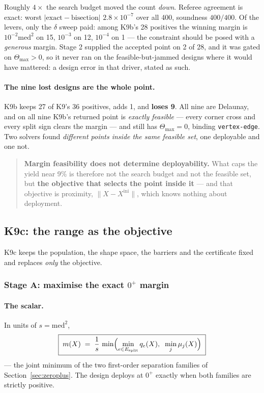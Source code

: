 \documentclass[11pt,a4paper]{article}
\theoremstyle{definition}
\newcommand{\Tmax}{\Theta_{\max}}
\newcommand{\Esplit}{E_{\mathrm{split}}}
\begin{document}
\noindent Roughly $4\times$ the search budget moved the count \emph{down}. Referee agreement
is exact: worst $|\text{exact}-\text{bisection}|$ $2.8\times10^{-7}$ over all 400, soundness
$400/400$. Of the levers, only the $\delta$ sweep paid: among K9b's 28 positives the winning
margin is $10^{-2}\mathrm{med}^2$ on 15, $10^{-3}$ on 12, $10^{-4}$ on 1 --- the constraint
should be posed with a \emph{generous} margin. Stage 2 supplied the accepted point on 2 of 28,
and it was gated on $\Tmax>0$, so it never ran on the feasible-but-jammed designs where it
would have mattered: a design error in that driver, stated as such.

\paragraph{The nine lost designs are the whole point.} K9b keeps 27 of K9's 36 positives, adds
1, and \textbf{loses 9}. All nine are Delaunay, and on all nine K9b's returned point is
\emph{exactly feasible} --- every corner cross and every split sign clears the margin --- and
still has $\Tmax=0$, binding \texttt{vertex-edge}. Two solvers found \emph{different points
inside the same feasible set}, one deployable and one not.

\begin{quote}
\textbf{Margin feasibility does not determine deployability.} What caps the yield near 9\% is
therefore not the search budget and not the feasible set, but \textbf{the objective that
selects the point inside it} --- and that objective is proximity, $\|X-X^{\mathrm{ini}}\|$,
which knows nothing about deployment.
\end{quote}

\subsection{K9c: the range as the objective}

K9c keeps the population, the shape space, the barriers and the certificate fixed and replaces
\emph{only} the objective.

\subsubsection{Stage A: maximise the exact \texorpdfstring{$0^+$}{0+} margin}

\paragraph{The scalar.} In units of $s=\mathrm{med}^2$,
\begin{equation}
\boxed{\;m(X) \;=\; \frac{1}{s}\,\min\Bigl(\min_{e\in\Esplit} q_e(X),\;\;\min_j \mu_j(X)\Bigr)\;}
\label{eq:margin}
\end{equation}
--- the joint minimum of the two first-order separation families of
Section~\ref{sec:zeroplus}. The design deploys at $0^+$ exactly when both families are
strictly positive.
\end{document}
